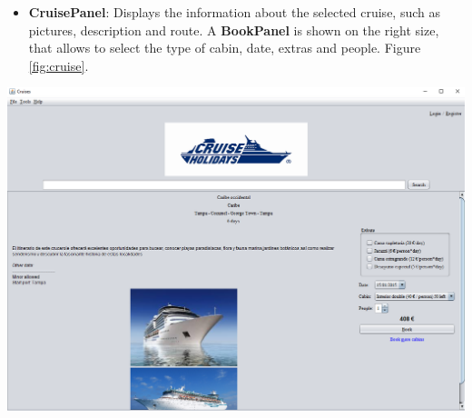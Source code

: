 \documentclass[11pt]{article}
\begin{document}
	\begin{qn}
	    \begin{itemize}
		    \item \textbf{CruisePanel}: Displays the information about the selected cruise, such as pictures, description and route. A \textbf{BookPanel} is shown on the right size, that allows to select the type of cabin, date, extras and people. Figure \ref{fig:cruise}.
		\end{itemize}
		\begin{center}
			\begin{minipage}{0.8\linewidth}
				\includegraphics[width=\linewidth]{images/cruise.png}
				\label{fig:cruise}
			\end{minipage}
		\end{center}
	\end{qn}
	
\end{document}

